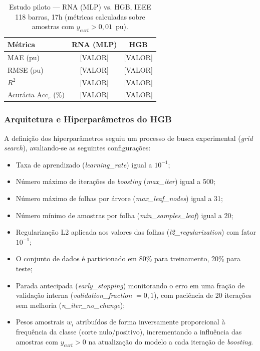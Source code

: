\documentclass[conference]{IEEEtran}
\begin{document}
\begin{table}[H]
\centering
\caption{Estudo piloto — RNA (MLP) vs. HGB, IEEE 118 barras, 17h
(métricas calculadas sobre amostras com $y_{curt} > 0{,}01$~pu).}
\label{tab:piloto_rna_hgb}
\begin{tabular}{lcc}
\hline
\textbf{Métrica} & \textbf{RNA (MLP)} & \textbf{HGB} \\
\hline
MAE (pu)              & [VALOR] & [VALOR] \\
RMSE (pu)             & [VALOR] & [VALOR] \\
$R^2$                 & [VALOR] & [VALOR] \\
Acurácia $\mathrm{Acc}_{\varepsilon}$ (\%) & [VALOR] & [VALOR] \\
\hline
\end{tabular}
\end{table}

\subsubsection{Arquitetura e Hiperparâmetros do HGB}

A definição dos hiperparâmetros seguiu um processo de busca experimental
(\textit{grid search}), avaliando-se as seguintes configurações:

\begin{itemize}
    \item Taxa de aprendizado (\textit{learning\_rate}) igual a $10^{-1}$;
    \item Número máximo de iterações de \textit{boosting}
          (\textit{max\_iter}) igual a 500;
    \item Número máximo de folhas por árvore
          (\textit{max\_leaf\_nodes}) igual a 31;
    \item Número mínimo de amostras por folha
          (\textit{min\_samples\_leaf}) igual a 20;
    \item Regularização L2 aplicada aos valores das folhas
          (\textit{l2\_regularization}) com fator $10^{-1}$;
    \item O conjunto de dados é particionado em 80\% para
          treinamento, 20\% para teste;
    \item Parada antecipada (\textit{early\_stopping}) monitorando o erro
          em uma fração de validação interna (\textit{validation\_fraction}
          $= 0{,}1$), com paciência de 20 iterações sem melhoria
          (\textit{n\_iter\_no\_change});
    \item Pesos amostrais $w_i$ atribuídos de forma inversamente
          proporcional à frequência da classe (corte nulo/positivo),
          incrementando a influência das amostras com $y_{curt} > 0$ na
          atualização do modelo a cada iteração de \textit{boosting}.
\end{itemize}
\end{document}

